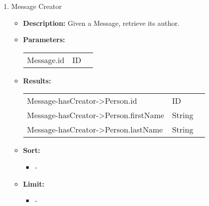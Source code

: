 {\begin{enumerate}
  \item Message Creator
    \begin{itemize}
      \item \textbf{Description:}
        Given a Message, retrieve its author.
      \item \textbf{Parameters:} \\
        \begin{tabular}{lll}
          Message.id 										& ID \\
        \end{tabular}
      \item \textbf{Results:} \\
        \begin{tabular}{lll}
          Message-hasCreator->Person.id     									& ID \\
          Message-hasCreator->Person.firstName     									& String \\
          Message-hasCreator->Person.lastName    									& String \\
        \end{tabular}
            \item \textbf{Sort:}
                  \begin{itemize}
                    \item[] -
                  \end{itemize}
            \item \textbf{Limit:}
                  \begin{itemize}
                    \item[] -
                  \end{itemize}
    \end{itemize}


\end{enumerate}}
